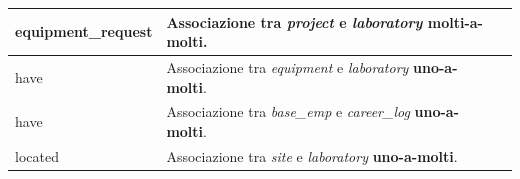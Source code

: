 \begin{tabular}{@{}| p{} | p{} | p{} |}
	\hline
	equipment\_request & \begin{minipage}[t]{0.4\textwidth}
		                     \raggedright
		                     Associazione tra \textit{project} e \textit{laboratory} \textbf{molti-a-molti}.
	                     \end{minipage}
	                   &                                                                                                       \\[15pt]
	\hline
	have               & \begin{minipage}[t]{0.4\textwidth}
		                     \raggedright
		                     Associazione tra \textit{equipment} e \textit{laboratory} \textbf{uno-a-molti}.
	                     \end{minipage}
	                   &                                                                                                       \\[15pt]
	\hline
	have               & \begin{minipage}[t]{0.4\textwidth}
		                     \raggedright
		                     Associazione tra \textit{base\_emp} e \textit{career\_log} \textbf{uno-a-molti}.
	                     \end{minipage}
	                   &                                                                                                       \\[15pt]
	\hline
	located            & \begin{minipage}[t]{0.4\textwidth}
		                     \raggedright
		                     Associazione tra \textit{site} e \textit{laboratory} \textbf{uno-a-molti}.
	                     \end{minipage}
	                   &                                                                                                       \\[15pt]
	\hline
\end{tabular}

